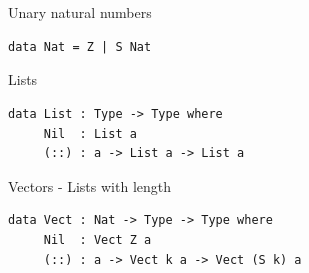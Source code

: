 \documentclass{beamer}
\begin{document}
\section{\dependentTypes}
\label{sec:dependentTypes}
\begin{frame}[fragile]{\dependentTypes}
	\begin{block}{Unary natural numbers}
		 \begin{lstlisting}[basicstyle=\ttfamily\scriptsize]
data Nat = Z | S Nat
		\end{lstlisting}
	\end{block}
	
	\begin{block}{Lists}
		 \begin{lstlisting}[basicstyle=\ttfamily\scriptsize]
data List : Type -> Type where
     Nil  : List a
     (::) : a -> List a -> List a		
		\end{lstlisting}
	\end{block}
	
	\begin{block}{Vectors - Lists with length}
		 \begin{lstlisting}[basicstyle=\ttfamily\scriptsize]
data Vect : Nat -> Type -> Type where
     Nil  : Vect Z a
     (::) : a -> Vect k a -> Vect (S k) a	
		\end{lstlisting}
	\end{block}
\end{frame}
\end{document}

